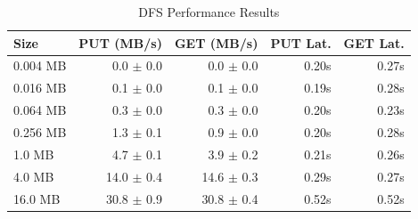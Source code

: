 \begin{table}[h]
\centering
\caption{DFS Performance Results}
\label{tab:dfs-perf}
\begin{tabular}{lrrrr}
\toprule
\textbf{Size} & \textbf{PUT (MB/s)} & \textbf{GET (MB/s)} & \textbf{PUT Lat.} & \textbf{GET Lat.} \\
\midrule
0.004 MB & 0.0 $\pm$ 0.0 & 0.0 $\pm$ 0.0 & 0.20s & 0.27s \\
0.016 MB & 0.1 $\pm$ 0.0 & 0.1 $\pm$ 0.0 & 0.19s & 0.28s \\
0.064 MB & 0.3 $\pm$ 0.0 & 0.3 $\pm$ 0.0 & 0.20s & 0.23s \\
0.256 MB & 1.3 $\pm$ 0.1 & 0.9 $\pm$ 0.0 & 0.20s & 0.28s \\
1.0 MB & 4.7 $\pm$ 0.1 & 3.9 $\pm$ 0.2 & 0.21s & 0.26s \\
4.0 MB & 14.0 $\pm$ 0.4 & 14.6 $\pm$ 0.3 & 0.29s & 0.27s \\
16.0 MB & 30.8 $\pm$ 0.9 & 30.8 $\pm$ 0.4 & 0.52s & 0.52s \\
\bottomrule
\end{tabular}
\end{table}